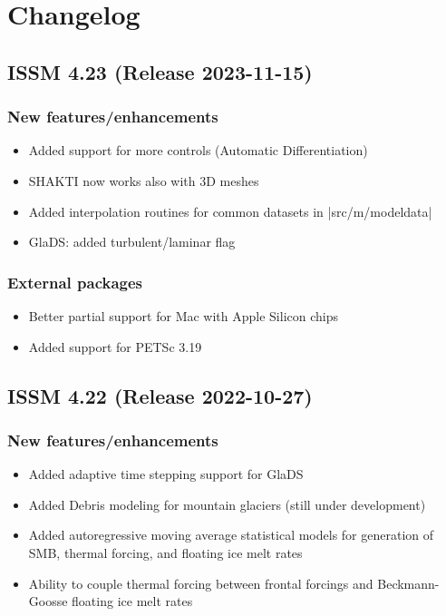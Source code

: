 
\section{Changelog} \label{sec:supplements-changelog}
\subsection*{ISSM 4.23 (Release 2023-11-15)}
\subsubsection{New features/enhancements}
\begin{itemize}
\item Added support for more controls (Automatic Differentiation)
\item SHAKTI now works also with 3D meshes
\item Added interpolation routines for common datasets in \lstinlinebg|src/m/modeldata|
\item GlaDS: added turbulent/laminar flag
\end{itemize}
\subsubsection{External packages}
\begin{itemize}
\item Better partial support for Mac with Apple Silicon chips
\item Added support for PETSc 3.19
\end{itemize}

\subsection*{ISSM 4.22 (Release 2022-10-27)}
\subsubsection{New features/enhancements}
\begin{itemize}
\item Added adaptive time stepping support for GlaDS
\item Added Debris modeling for mountain glaciers (still under development)
\item Added autoregressive moving average statistical models for generation of SMB, thermal forcing, and floating ice melt rates
\item Ability to couple thermal forcing between frontal forcings and Beckmann-Goosse floating ice melt rates
\end{itemize}

